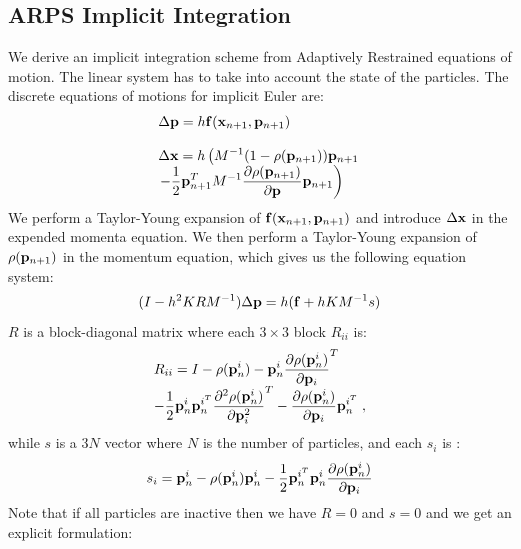 \subsection{ ARPS Implicit Integration }
We derive an implicit integration scheme from Adaptively Restrained equations of motion.
The linear system has to take into account the state of the particles.
The discrete equations of motions for implicit Euler are:
\begin{equation}
	\label{eq:implicitEqMotion}
	\begin{array}{l}
	\displaystyle \Delta \mathbf{p} =  h \mathbf{f}(\mathbf{x}_{n+1}, \mathbf{p}_{n+1})\\
				\\
	\displaystyle \Delta \mathbf{x} = h \left( M^{-1}(1-\rho(\mathbf{p}_{n+1}))\mathbf{p}_{n+1} \right. \\
	\displaystyle \left. - \frac{1}{2}\mathbf{p}_{n+1}^{T} M^{-1} \frac{\partial \rho(\mathbf{p}_{n+1})}{\partial \mathbf{p}}\mathbf{p}_{n+1} \right)
	\end{array}
\end{equation}
We perform a Taylor-Young expansion of $\mathbf{f}(\mathbf{x}_{n+1}, \mathbf{p}_{n+1})$ and introduce $\Delta \mathbf{x}$ in the expended momenta equation.
We then perform a Taylor-Young expansion of $\rho(\mathbf{p}_{n+1})$ in the momentum equation, which gives us the following equation system:
\begin{equation}
	\label{eq:arpsLinearSystem}
	( I -h^{2}KRM^{-1} ) \Delta \mathbf{p} = h( \mathbf{f} + h KM^{-1}s )
\end{equation}
$R$ is a block-diagonal matrix where each $3\times 3$ block $R_{ii}$ is:
\begin{equation}
	\label{eq:Ri}
	\begin{array}{l}
	\displaystyle R_{ii} = I - \rho(\mathbf{p}^{i}_{n}) - \mathbf{p}^{i}_{n} \frac{\partial \rho(\mathbf{p}^{i}_{n})}{\partial \mathbf{p}_{i}}^{T} \\
	\displaystyle - \frac{1}{2}\mathbf{p}^{i}_{n}\mathbf{p}^{i^{T}}_{n}\frac{\partial^{2} \rho(\mathbf{p}^{i}_{n})}{\partial \mathbf{p}_{i}^{2}}^{T} -
	\displaystyle \frac{\partial \rho(\mathbf{p}^{i}_{n})}{\partial \mathbf{p}_{i}} \mathbf{p}^{i^{T}}_{n} \;,
	\end{array}
\end{equation}
while $s$ is a $3N$ vector where $N$ is the number of particles, and each $s_{i}$ is :
\begin{equation}
	\label{eq:si}
	\displaystyle s_{i} = \mathbf{p}^{i}_{n} - \rho(\mathbf{p}^{i}_{n})\mathbf{p}^{i}_{n} - \frac{1}{2	}\mathbf{p}^{i^{T}}_{n}\mathbf{p}^{i}_{n}\frac{\partial \rho(\mathbf{p}^{i}_{n})}{\partial \mathbf{p}_{i}}
\end{equation}
Note that if all particles are inactive then we have $R = 0$ and $s = 0$ and we get an explicit formulation:
